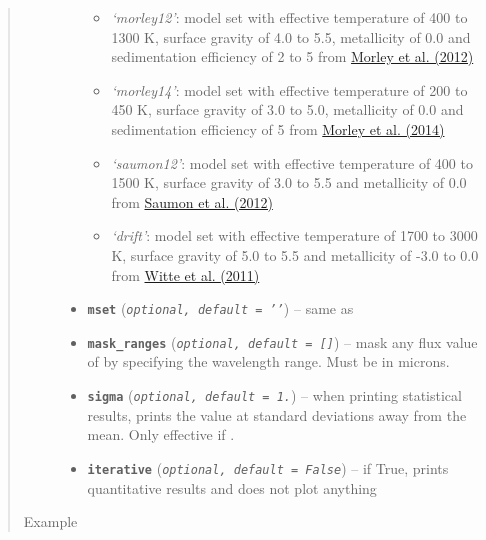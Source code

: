 \documentclass[letterpaper,10pt,english]{sphinxmanual}
\begin{document}
\begin{fulllineitems}
\begin{quote}
\begin{description}
\begin{itemize}
\begin{itemize}
\item {} 
\emph{`morley12'}: model set with effective temperature of 400 to 1300 K, surface gravity of 4.0 to 5.5, metallicity of 0.0
and sedimentation efficiency of 2 to 5 from \href{http://adsabs.harvard.edu/abs/2012ApJ...756..172M}{Morley et al. (2012)}

\item {} 
\emph{`morley14'}: model set with effective temperature of 200 to 450 K, surface gravity of 3.0 to 5.0, metallicity of 0.0
and sedimentation efficiency of 5 from \href{http://adsabs.harvard.edu/abs/2014ApJ...787...78M}{Morley et al. (2014)}

\item {} 
\emph{`saumon12'}: model set with effective temperature of 400 to 1500 K, surface gravity of 3.0 to 5.5 and metallicity of 0.0
from \href{http://adsabs.harvard.edu/abs/2012ApJ...750...74S}{Saumon et al. (2012)}

\item {} 
\emph{`drift'}: model set with effective temperature of 1700 to 3000 K, surface gravity of 5.0 to 5.5 and metallicity of -3.0 to 0.0
from \href{http://adsabs.harvard.edu/abs/2011A\%26A...529A..44W}{Witte et al. (2011)}

\end{itemize}


\item {} 
\textbf{\texttt{mset}} (\emph{\texttt{optional, default = '{'}}}) -- same as 

\item {} 
\textbf{\texttt{mask\_ranges}} (\emph{\texttt{optional, default = {[}{]}}}) -- mask any flux value of  by specifying the wavelength range. Must be in microns.

\item {} 
\textbf{\texttt{sigma}} (\emph{\texttt{optional, default = 1.}}) -- when printing statistical results, prints the value at  standard
deviations away from the mean. Only effective if .

\item {} 
\textbf{\texttt{iterative}} (\emph{\texttt{optional, default = False}}) -- if True, prints quantitative results and does not plot anything

\end{itemize}

\item[{Example}] \leavevmode
\end{description}\end{quote}


\end{fulllineitems}
\end{document}
